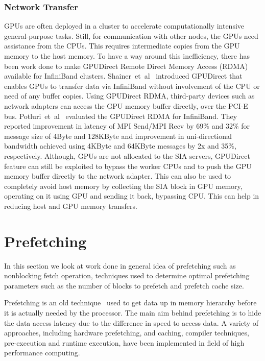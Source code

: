 \subsubsection{Network Transfer}
GPUs are often deployed in a cluster to accelerate computationally intensive
general-purpose tasks. Still, for communication with other nodes, the GPUs need assistance from the CPUs.
This requires intermediate copies from the GPU memory to the host memory. To have
a way around this inefficiency, there has been work done to make GPUDirect Remote
Direct Memory Access (RDMA) available for InfiniBand clusters. Shainer~et~al~\cite{Shainer2011} introduced
GPUDirect that enables GPUs to transfer data via InfiniBand without involvement
of the CPU or need of any buffer copies. Using GPUDirect RDMA, third-party devices such as
network adapters can access the GPU memory buffer directly, over the PCI-E bus.
Potluri~et~al~\cite{Potluri:2013:EIM:2570457.2571010} evaluated the GPUDirect RDMA for InfiniBand. They reported
improvement in latency of MPI Send/MPI Recv by 69\% and 32\% for message size of
4Byte and 128KByte and improvement in uni-directional bandwidth achieved using
4KByte and 64KByte messages by 2x and 35\%, respectively.
Although, GPUs are not allocated to the SIA servers, GPUDirect feature can still
be exploited to bypass the worker CPUs and to push the GPU memory buffer directly to the network
adapter. This can also be used to completely avoid host memory by collecting the
SIA block in GPU memory, operating on it using GPU and sending it back, bypassing
CPU. This can help in reducing host and GPU memory transfers.

\section{Prefetching}
In this section we look at work done in general idea of prefetching such as
nonblocking fetch operation, techniques used to determine optimal prefetching
parameters such as the number of blocks to prefetch and prefetch cache size.

Prefetching is an old technique~\cite{anacker68}\cite{Smith1982}\cite{Vanderwiel2000}
used to get data up in memory hierarchy before it is actually needed by the processor.
The main aim behind prefetching is to hide the data access latency due to the difference in speed to access
data. A variety of approaches, including hardware prefetching, and caching, compiler
techniques, pre-execution and runtime execution, have been implemented in field of
high performance computing.

